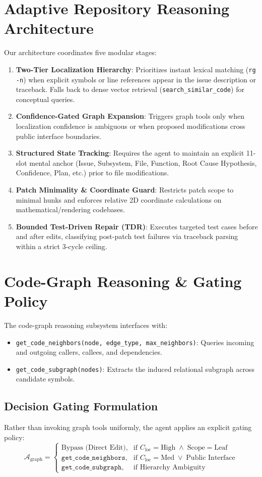 \documentclass[10pt,twocolumn,letterpaper]{article}
\begin{document}
\section{Adaptive Repository Reasoning Architecture}
Our architecture coordinates five modular stages:
\begin{enumerate}
    \item \textbf{Two-Tier Localization Hierarchy}: Prioritizes instant lexical matching (\texttt{rg -n}) when explicit symbols or line references appear in the issue description or traceback. Falls back to dense vector retrieval (\texttt{search\_similar\_code}) for conceptual queries.
    \item \textbf{Confidence-Gated Graph Expansion}: Triggers graph tools only when localization confidence is ambiguous or when proposed modifications cross public interface boundaries.
    \item \textbf{Structured State Tracking}: Requires the agent to maintain an explicit 11-slot mental anchor (Issue, Subsystem, File, Function, Root Cause Hypothesis, Confidence, Plan, etc.) prior to file modifications.
    \item \textbf{Patch Minimality \& Coordinate Guard}: Restricts patch scope to minimal hunks and enforces relative 2D coordinate calculations on mathematical/rendering codebases.
    \item \textbf{Bounded Test-Driven Repair (TDR)}: Executes targeted test cases before and after edits, classifying post-patch test failures via traceback parsing within a strict 3-cycle ceiling.
\end{enumerate}

\section{Code-Graph Reasoning \& Gating Policy}
The code-graph reasoning subsystem interfaces with:
\begin{itemize}
    \item \texttt{get\_code\_neighbors(node, edge\_type, max\_neighbors)}: Queries incoming and outgoing callers, callees, and dependencies.
    \item \texttt{get\_code\_subgraph(nodes)}: Extracts the induced relational subgraph across candidate symbols.
\end{itemize}

\subsection{Decision Gating Formulation}
Rather than invoking graph tools uniformly, the agent applies an explicit gating policy:
\begin{equation}
\mathcal{A}_{\text{graph}} = \begin{cases} 
\text{Bypass (Direct Edit)}, & \text{if } C_{\text{loc}} = \text{High} \;\wedge\; \text{Scope} = \text{Leaf} \\
\texttt{get\_code\_neighbors}, & \text{if } C_{\text{loc}} = \text{Med} \;\vee\; \text{Public Interface} \\
\texttt{get\_code\_subgraph}, & \text{if } \text{Hierarchy Ambiguity}
\end{cases}
\end{equation}
\end{document}
